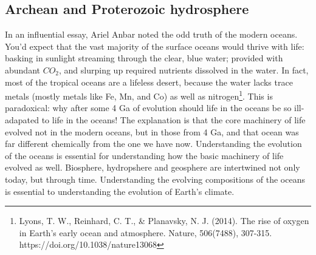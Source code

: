 {\subsection{Archean and Proterozoic hydrosphere}
In an influential essay, Ariel Anbar noted the odd truth of the modern oceans. You'd expect that the vast majority of the surface oceans would thrive with life: basking in sunlight streaming through the clear, blue water; provided with abundant $CO_2$, and slurping up required nutrients dissolved in the water. In fact, most of the tropical oceans are a lifeless desert, because the water lacks trace metals (mostly metals like Fe, Mn, and Co) as well as nitrogen\footnote{Lyons, T. W., Reinhard, C. T., \& Planavsky, N. J. (2014). The rise of oxygen in Earth's early ocean and atmosphere. Nature, 506(7488), 307-315. https://doi.org/10.1038/nature13068}. This is paradoxical: why after some 4 Ga of evolution should life in the oceans be so ill-adapated to life in the oceans! The explanation is that the core machinery of life evolved not in the modern oceans, but in those from 4 Ga, and that ocean was far different chemically from the one we have now. Understanding the evolution of the oceans is essential for understanding how the basic machinery of life evolved as well. Biosphere, hydropshere and geosphere are  intertwined not only today, but through time. Understanding the evolving compositions of the oceans is essential to understanding the evolution of Earth's climate.     
}
